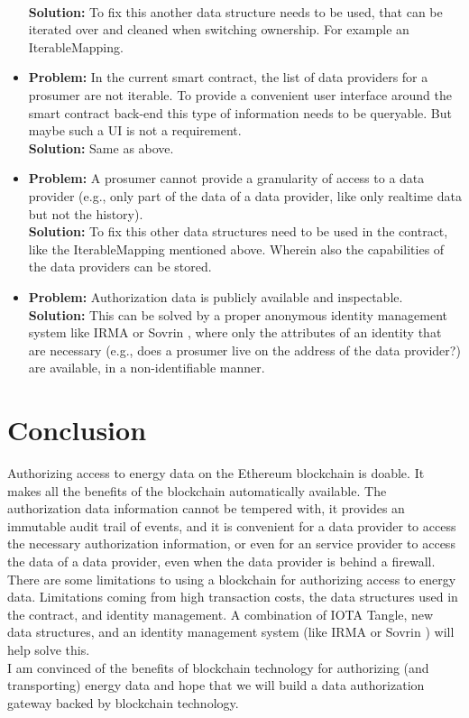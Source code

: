 \documentclass[paper=a4, fontsize=11pt]{scrartcl}
\numberwithin{equation}{section} %
\numberwithin{figure}{section}   %
\numberwithin{table}{section}    %
\begin{document}
\begin{itemize}
  \\\textbf{Solution:} To fix this another data structure needs to be used, that
  can be iterated over and cleaned when switching ownership. For example an
  IterableMapping.
\item \textbf{Problem:} In the current smart contract, the list of data providers for a
  prosumer are not iterable. To provide a convenient user interface around the
  smart contract back-end this type of information needs to be queryable. But
  maybe such a UI is not a requirement. \\\textbf{Solution:} Same as above.
\item \textbf{Problem:} A prosumer cannot provide a granularity of access to a
  data provider (e.g., only part of the data of a data provider, like only realtime data but
  not the history). \\\textbf{Solution:} To fix this other data structures need
  to be used in the contract, like the IterableMapping mentioned above. Wherein
  also the capabilities of the data providers can be stored.
\item \textbf{Problem:} Authorization data is publicly available and
  inspectable. \\\textbf{Solution:} This can be solved by a proper anonymous
  identity management system like IRMA \cite{irma} or Sovrin \cite{sovrin},
  where only the attributes of an identity that are necessary (e.g., does a
  prosumer live on the address of the data provider?) are available, in a
  non-identifiable manner.
\end{itemize}

\section{Conclusion}

Authorizing access to energy data on the Ethereum blockchain is doable. It makes
all the benefits of the blockchain automatically available. The authorization
data information cannot be tempered with, it provides an immutable audit trail
of events, and it is convenient for a data provider to access the necessary
authorization information, or even for an service provider to access the data of
a data
provider, even when the data provider is behind a firewall.\\

There are some limitations to using a blockchain for authorizing access to
energy data. Limitations coming from high transaction costs, the data structures
used in the contract, and identity management. A combination of IOTA Tangle, new
data structures, and an identity management system (like IRMA \cite{irma} or
Sovrin \cite{sovrin}) will help solve this.\\

I am convinced of the benefits of blockchain technology for authorizing (and
transporting) energy data and hope that we will build a data authorization
gateway backed by blockchain technology. \\



\end{document}

